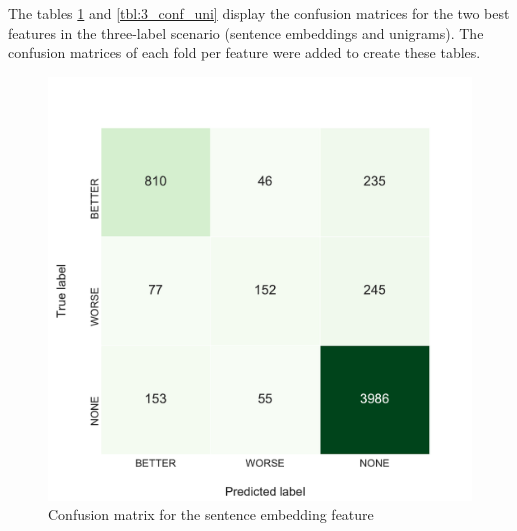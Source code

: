 The tables \ref{tbl:3_conf_inf} and \ref{tbl:3_conf_uni} display the confusion matrices for the two best features in the three-label scenario (sentence embeddings and unigrams). The confusion matrices of each fold per feature were added to create these tables.





\begin{figure}[h]
    \begin{minipage}{.5\linewidth}
   \caption{Confusion matrix for the sentence embedding feature} 
    \label{tbl:3_conf_inf}
 \centering
	\includegraphics[width=1\linewidth]{images/experiments/conf-InferSent_False}
  \end{minipage} \hfill
    \begin{minipage}{.5\linewidth}
  

\end{minipage}
\end{figure}

